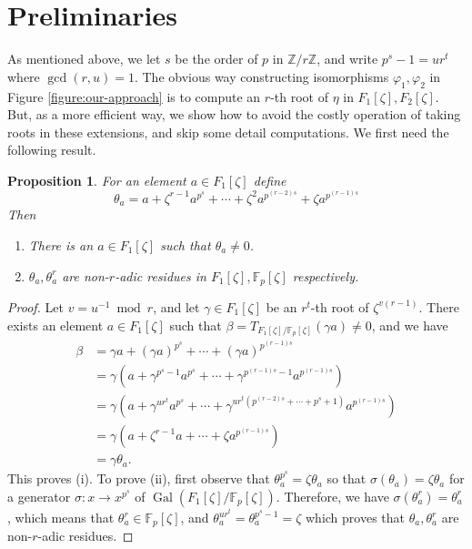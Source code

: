 \documentclass[12pt]{article}
\theoremstyle{plain}
\newtheorem{proposition}[theorem]{Proposition}
\theoremstyle{definition}
\DeclareMathOperator{\gal}{Gal}
\def\F{\mathbb{F}}
\begin{document}

\section{Preliminaries}

As mentioned above, we let $s$ be the order of $p$ in $\mathbb{Z} / r\mathbb{Z}$, and write $p^s - 1 = ur^t$ where $\gcd(r, u) = 1$. The obvious way constructing isomorphisms $\varphi_1, \varphi_2$ in Figure \ref{figure:our-approach} is to compute an $r$-th root of $\eta$ in $F_1[\zeta], F_2[\zeta]$. But, as a more efficient way, we show how to avoid the costly operation of taking roots in these extensions, and skip some detail computations. We first need the following result.
\begin{proposition}
\label{proposition:semi-trace}
	For an element $a \in F_1[\zeta]$ define 
	\begin{equation}
	\label{equation:semi-trace} 
		\theta_a = a + \zeta^{r - 1}a^{p^s} + \cdots + \zeta^2a^{p^{(r - 2)s}} + \zeta a^{p^{(r - 1)s}}
	\end{equation}
	Then
	\begin{enumerate}
		\item[\normalfont (i)] There is an $a \in F_1[\zeta]$ such that $\theta_a \ne 0$.
		\item[\normalfont (ii)] $\theta_a, \theta_a^r$ are non-$r$-adic residues in $F_1[\zeta], \F_p[\zeta]$ respectively.
	\end{enumerate}
\end{proposition}
\begin{proof}
	Let $v = u^{-1} \bmod r$, and let $\gamma \in F_1[\zeta]$ be an $r^t$-th root of $\zeta^{v(r - 1)}$. There exists an element $a \in F_1[\zeta]$ such that $\beta = T_{F_1[\zeta] / \F_p[\zeta]}(\gamma a) \ne 0$, and we have
	\begin{equation}
	\label{equation:trace}
		\begin{aligned}
			\beta 
			& = \gamma a + (\gamma a)^{p^s} + \cdots + (\gamma a)^{p^{(r - 1)s}} \\
			& = \gamma (a + \gamma^{p^s - 1}a^{p^s} + \cdots + \gamma^{p^{(r - 1)s} - 1}a^{p^{(r - 1)s}}) \\
			& = \gamma (a + \gamma^{ur^t}a^{p^s} + \cdots + \gamma^{ur^t(p^{(r - 2)s} + \cdots + p^s + 1)}a^{p^{(r - 1)s}}) \\
			& = \gamma (a + \zeta^{r - 1}a + \cdots + \zeta a^{p^{(r - 1)s}}) \\
			& = \gamma \theta_a.
		\end{aligned}
	\end{equation}
	This proves (i). To prove (ii), first observe that $\theta_a^{p^s} = \zeta\theta_a$ so that $\sigma(\theta_a) = \zeta\theta_a$ for a generator $\sigma: x \to x^{p^s}$ of $\gal(F_1[\zeta] / \F_p[\zeta])$. Therefore, we have $\sigma(\theta_a^r) = \theta_a^r$, which means that $\theta_a^r \in \F_p[\zeta]$, and $\theta_a^{ur^t} = \theta_a^{p^s - 1} = \zeta$ which proves that $\theta_a, \theta_a^r$ are non-$r$-adic residues.
\end{proof}
\end{document}
